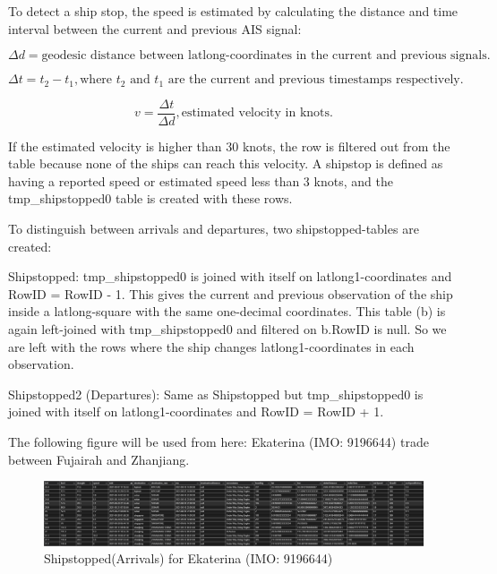 To detect a ship stop, the speed is estimated by calculating the distance and time interval between the current and previous AIS signal:

\begin{equation}
    \Delta d = \text{geodesic distance between latlong-coordinates in the current and previous signals.}
\end{equation}

\begin{equation}
    \Delta t = t_2 - t_1, \text{where } t_2 \text{ and } t_1 \text{ are the current and previous timestamps respectively.}
\end{equation}

\begin{equation}
    v = \frac{\Delta t}{\Delta d}, \text{estimated velocity in knots.}
\end{equation}

If the estimated velocity is higher than 30 knots, the row is filtered out from the table because none of the ships can reach this velocity. A shipstop is defined as having a reported speed or estimated speed less than 3 knots, and the tmp\_shipstopped0 table is created with these rows.

To distinguish between arrivals and departures, two shipstopped-tables are created:

Shipstopped: tmp\_shipstopped0 is joined with itself on latlong1-coordinates and \newline RowID = RowID - 1.
This gives the current and previous observation of the ship inside a latlong-square with the same one-decimal coordinates.
This table (b) is again left-joined with tmp\_shipstopped0 and filtered on b.RowID is null. So we are left with the rows where the ship changes latlong1-coordinates in each observation.

Shipstopped2 (Departures): Same as Shipstopped but tmp\_shipstopped0 is joined with itself on latlong1-coordinates and RowID = RowID + 1.


The following figure will be used from here: Ekaterina (IMO: 9196644) trade between Fujairah and Zhanjiang.

\begin{figure}[h]
    \centering
    \includegraphics[width=1\textwidth]{images/ship_stop1.png}
    \caption{Shipstopped(Arrivals) for Ekaterina (IMO: 9196644)}
    \label{ship_stop1}
\end{figure}

